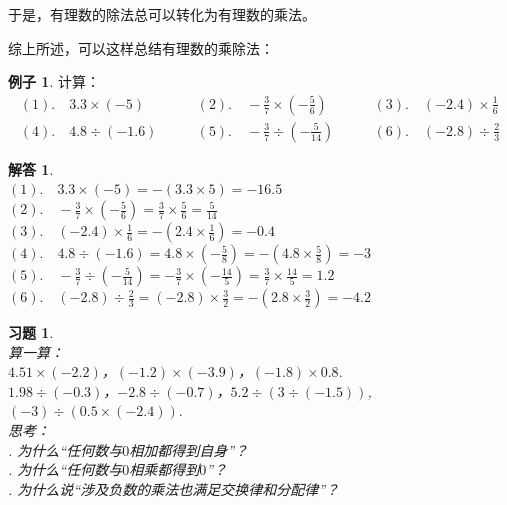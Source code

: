 \documentclass[12pt,UTF8]{ctexbook}
\theoremstyle{definition}
\newtheorem{ex}{例子}[section]
\newtheorem*{so}{解答}
\theoremstyle{plain}
\newtheorem{xt}{习题}[section]
\begin{document}
于是，有理数的除法总可以转化为有理数的乘法。

综上所述，可以这样总结有理数的乘除法：
\begin{center}
\end{center}
\begin{ex}
    计算：
    $$
    \begin{array}{lll}
        (1). \quad 3.3 \times (-5) \quad & \quad (2). \quad -\frac{3}{7} \times (- \frac{5}{6}) \quad & \quad (3). \quad (-2.4) \times \frac{1}{6} \\
        (4). \quad 4.8 \div (-1.6) \quad & \quad (5). \quad -\frac{3}{7} \div (- \frac{5}{14}) \quad & \quad (6). \quad (-2.8) \div \frac{2}{3}
    \end{array}
    $$
\end{ex}
\begin{so}
    \mbox{}\\
    \indent $(1). \quad 3.3 \times (-5) = -(3.3 \times 5) = -16.5$ \\
    \indent $(2). \quad -\frac{3}{7} \times (- \frac{5}{6}) = \frac{3}{7} \times \frac{5}{6} = \frac{5}{14}$ \\
    \indent $(3). \quad (-2.4) \times \frac{1}{6} = -(2.4 \times \frac{1}{6}) = -0.4$ \\
    \indent $(4). \quad 4.8 \div (-1.6) =  4.8 \times (-\frac{5}{8}) = -(4.8 \times \frac{5}{8}) = -3$ \\
    \indent $(5). \quad -\frac{3}{7} \div (- \frac{5}{14}) = -\frac{3}{7} \times (- \frac{14}{5}) = \frac{3}{7} \times \frac{14}{5} = 1.2$ \\
    \indent $(6). \quad (-2.8) \div \frac{2}{3} = (-2.8) \times \frac{3}{2} = -(2.8 \times \frac{3}{2}) = -4.2 $ 
\end{so}

\begin{xt}\label{xt:3-1-0}
    \mbox{}\\
    \indent 算一算：\\
    \indent $4.51 \times (-2.2)$，$(-1.2) \times (-3.9)$，$(-1.8)\times 0.8.$ \\
    \indent $1.98 \div (-0.3)$，$-2.8 \div (-0.7)$，$5.2 \div (3 \div (-1.5))$, $(-3) \div (0.5 \times (-2.4)).$ \\
    \indent 思考：\\
    . 为什么“任何数与$0$相加都得到自身”？\\
    . 为什么“任何数与$0$相乘都得到$0$”？\\
    . 为什么说“涉及负数的乘法也满足交换律和分配律”？
\end{xt}
\end{document}
